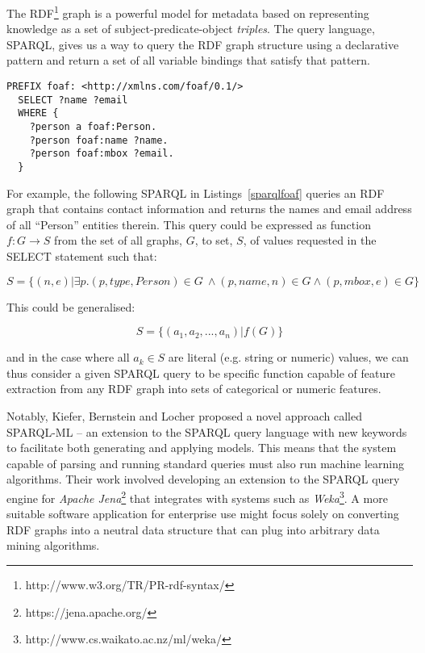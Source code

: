 \documentclass[10pt,a4paper]{report}
\begin{document}
The RDF\footnote{http://www.w3.org/TR/PR-rdf-syntax/} graph is a powerful model
for metadata based on representing knowledge as a set of subject-predicate-object
\emph{triples}. The query language, SPARQL, gives us a way to query the RDF
graph structure using a declarative pattern and return a set of all variable
bindings that satisfy that pattern.

\begin{lstlisting}[label=lst:sparqlfoaf,caption={Example SPARQL query for people's names and email addresses},frame=single,captionpos=b]
  PREFIX foaf: <http://xmlns.com/foaf/0.1/>
  SELECT ?name ?email
  WHERE {
    ?person a foaf:Person.
    ?person foaf:name ?name.
    ?person foaf:mbox ?email.
  }
\end{lstlisting}

For example, the following SPARQL in Listings~\ref{sparqlfoaf}
queries an RDF graph that contains contact information and returns the
names and email address of all ``Person'' entities therein. This query could be
expressed as function $f: G \rightarrow S$ from the set of all graphs, $G$, to
set, $S$, of values requested in the SELECT statement such that:

\begin{displaymath}
  S = \{(n, e) | \exists p . (p, type, Person) \in G\ \land (p, name, n) \in G \land (p, mbox, e) \in G\}
\end{displaymath}

This could be generalised:

\begin{displaymath}
  S = \{(a_1, a_2, ..., a_n) | f(G) \}
\end{displaymath}

\noindent and in the case where all $a_k \in S$ are literal (e.g. string or
numeric) values, we can thus consider a given SPARQL query to be specific function
capable of feature extraction from any RDF graph into sets of categorical or
numeric features.

Notably, Kiefer, Bernstein and Locher\cite{kiefer2008adding} proposed a novel
approach called SPARQL-ML -- an extension to the
SPARQL\cite{segaran2009programming} query language with new keywords to
facilitate both generating and applying models. This means that the system capable
of parsing and running standard queries must also run machine learning
algorithms. Their work involved developing an extension to the SPARQL query
engine for \emph{Apache Jena}\footnote{https://jena.apache.org/} that integrates
with systems such as \emph{Weka}\footnote{http://www.cs.waikato.ac.nz/ml/weka/}.
A more suitable software application for enterprise use might focus solely on
converting RDF graphs into a neutral data structure that can plug into arbitrary
data mining algorithms.
\end{document}
